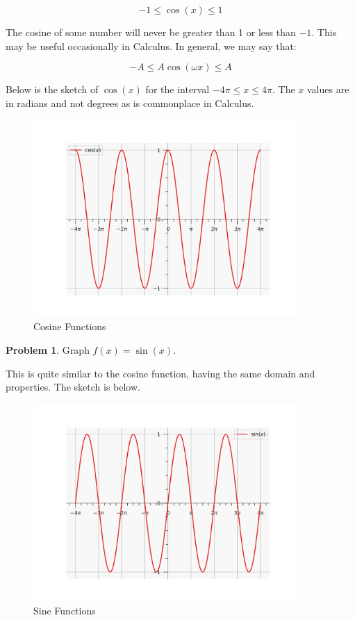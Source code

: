 \documentclass[12pt]{article}
\theoremstyle{definition}
\newtheorem{problem}{Problem}
\begin{document}
\begin{equation}
    -1 \leq \cos(x) \leq 1
\end{equation}

The cosine of some number will never be greater than 1 or less than $-1$.
This may be useful occasionally in Calculus.
In general, we may say that:

\begin{equation}
    -A \leq A\cos(\omega x) \leq A
\end{equation}

Below is the sketch of $\cos(x)$ for the interval $-4\pi \leq x \leq 4\pi$.
The $x$ values are in radians and not degrees as is commonplace in Calculus.

\begin{figure}[H]
    \centering
    \includegraphics[width=10cm, keepaspectratio]{graph_12.png}
    \caption{Cosine Functions}
    \label{fig:fig12}
\end{figure}

\begin{problem}
Graph $f(x)=\sin(x)$.
\end{problem}

This is quite similar to the cosine function, having the same domain and properties.
The sketch is below.

\begin{figure}[H]
    \centering
    \includegraphics[width=10cm, keepaspectratio]{graph_13.png}
    \caption{Sine Functions}
    \label{fig:fig13}
\end{figure}
\end{document}
